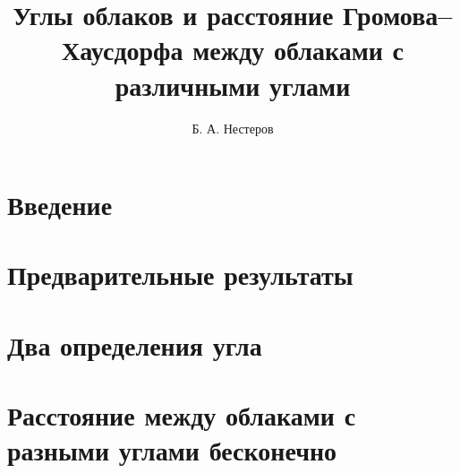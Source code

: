 \documentclass[11pt,twoside,draft
]{article}
\title
{%
Углы облаков и расстояние Громова--Хаусдорфа между облаками с различными углами
  }
{%
  Angles of clouds and the Gromov--Hausdorff distance between clouds with different angles}
\author
{%
Б. А. Нестеров}
{%
B. A. Nesterov}
\begin{document}
\maketitle
\newpage
\tableofcontents
\newpage

\section{Введение}

\section{Предварительные результаты}


\section{Два определения угла}  

\section{Расстояние между облаками с разными углами бесконечно}

\label{end}


\end{document}
